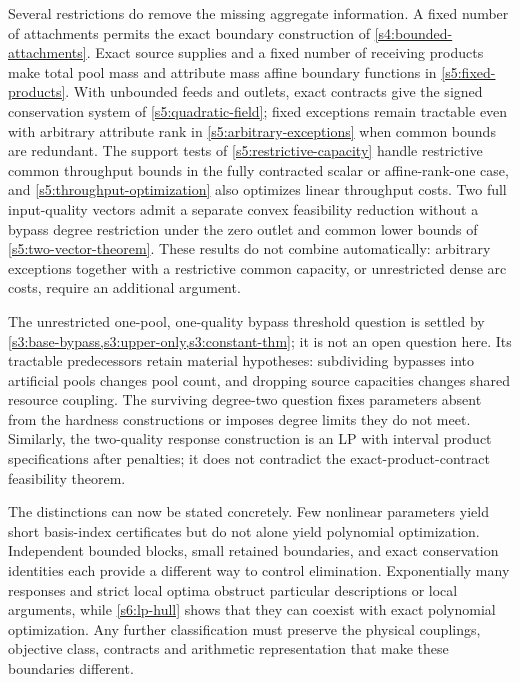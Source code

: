 Several restrictions do remove the missing aggregate information.
A fixed number of attachments permits the exact boundary construction
of \cref{s4:bounded-attachments}. Exact source supplies and a fixed
number of receiving products make total pool mass and attribute mass
affine boundary functions in \cref{s5:fixed-products}. With unbounded
feeds and outlets, exact contracts give the signed conservation system
of \cref{s5:quadratic-field}; fixed exceptions remain tractable even
with arbitrary attribute rank in \cref{s5:arbitrary-exceptions} when
common bounds are redundant. The support tests of
\cref{s5:restrictive-capacity} handle restrictive common throughput
bounds in the fully contracted scalar or affine-rank-one case, and
\cref{s5:throughput-optimization} also optimizes linear throughput
costs. Two full input-quality vectors admit a separate convex feasibility
reduction without a bypass degree restriction under the zero outlet
and common lower bounds of \cref{s5:two-vector-theorem}.
These results do not combine automatically: arbitrary exceptions together
with a restrictive common capacity, or unrestricted dense arc costs,
require an additional argument.

The unrestricted one-pool, one-quality bypass threshold question is
settled by \cref{s3:base-bypass,s3:upper-only,s3:constant-thm}; it is not
an open question here. Its tractable predecessors retain material
hypotheses: subdividing bypasses into artificial pools changes pool
count, and dropping source capacities changes shared resource coupling.
The surviving degree-two question fixes parameters absent from the
hardness constructions or imposes degree limits they do not meet.
Similarly, the two-quality response construction is an LP with interval
product specifications after penalties; it does not contradict the
exact-product-contract feasibility theorem.

The distinctions can now be stated concretely. Few nonlinear parameters
yield short basis-index certificates but do not alone yield polynomial
optimization. Independent bounded blocks, small retained boundaries,
and exact conservation identities each provide a different way to
control elimination. Exponentially many responses and strict local
optima obstruct particular descriptions or local arguments, while
\cref{s6:lp-hull} shows that they can coexist with exact polynomial
optimization. Any further classification must preserve the physical
couplings, objective class, contracts and arithmetic representation
that make these boundaries different.
